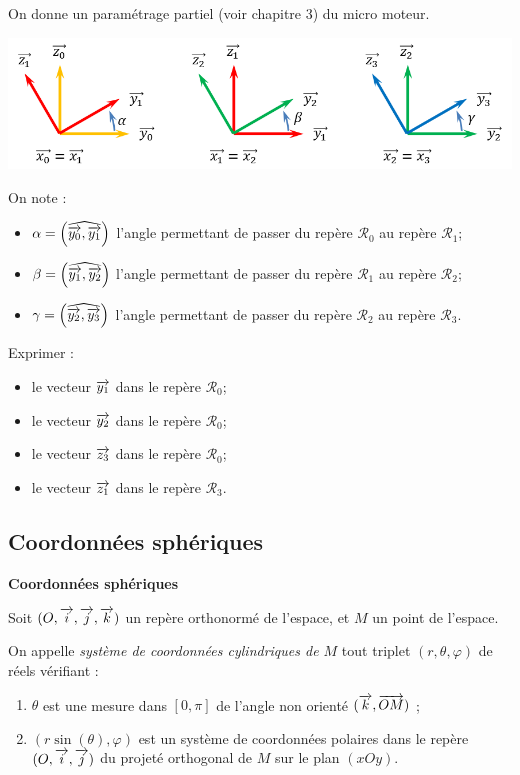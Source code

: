\documentclass[10pt,oneside]{article}
\begin{document}
\begin{exemple}
On donne un paramétrage partiel (voir chapitre 3) du micro moteur. 
\begin{center}
\includegraphics[width=.8\textwidth]{png/parametrage}
\end{center}
On note :
\begin{itemize}
\item $\alpha =\left(\widehat{\overrightarrow{y_0},\overrightarrow{y_1}}\right)$ l'angle permettant de passer du repère $\mathcal{R}_0$ au repère $\mathcal{R}_1$;
\item $\beta =\left(\widehat{\overrightarrow{y_1},\overrightarrow{y_2}}\right)$ l'angle permettant de passer du repère $\mathcal{R}_1$ au repère $\mathcal{R}_2$;
\item $\gamma =\left(\widehat{\overrightarrow{y_2},\overrightarrow{y_3}}\right)$ l'angle permettant de passer du repère $\mathcal{R}_2$ au repère $\mathcal{R}_3$.
\end{itemize}
Exprimer : 
\begin{itemize}
\item le vecteur $\overrightarrow{y_1}$ dans le repère $\mathcal{R}_0$;
\item le vecteur $\overrightarrow{y_2}$ dans le repère $\mathcal{R}_0$;
\item le vecteur $\overrightarrow{z_3}$ dans le repère $\mathcal{R}_0$;
\item le vecteur $\overrightarrow{z_1}$ dans le repère $\mathcal{R}_3$.
\end{itemize}
\end{exemple}



\subsection{Coordonnées sphériques}

\begin{defi}
\textbf{Coordonnées sphériques}

Soit $(O, \overrightarrow{i}, \overrightarrow{j}, \overrightarrow{k})$ un repère orthonormé de l'espace, et $M$ un point de l'espace.

On appelle \emph{système de coordonnées cylindriques de $M$} tout triplet $(r,\theta,\varphi)$ de réels vérifiant :
	\begin{enumerate}
	\item $\theta$ est une mesure dans $[0,\pi]$ de l'angle non orienté $(\overrightarrow{k}, \overrightarrow{OM})$ ;
	\item $(r\sin(\theta),\varphi)$ est un système de coordonnées polaires dans le repère $(O, \overrightarrow{i}, \overrightarrow{j})$ du projeté orthogonal de $M$ sur le plan $(xOy)$.
	\end{enumerate}
\end{defi}
\end{document}
